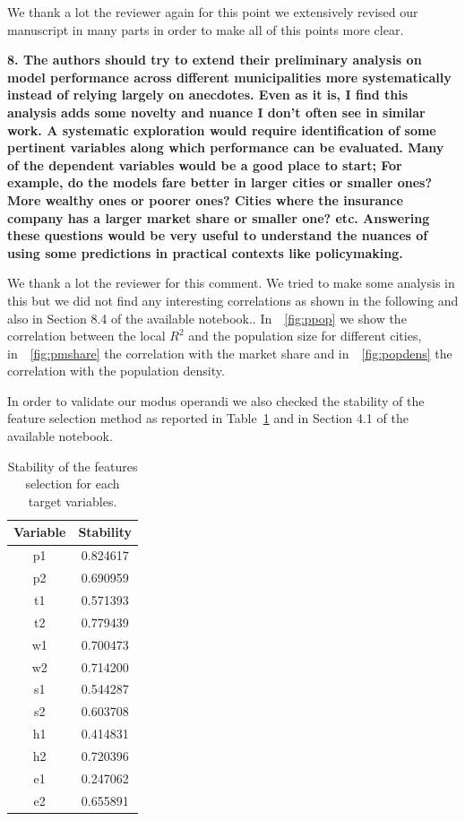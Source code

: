 \documentclass[12pt]{article}
\begin{document}
We thank a lot the reviewer again for this point we extensively revised our manuscript in many parts in order to make all of this points more clear. 

\textbf{8. The authors should try to extend their preliminary analysis on model performance across different municipalities more systematically instead of relying largely on anecdotes. Even as it is, I find this analysis adds some novelty and nuance I don't often see in similar work. A systematic exploration would require identification of some pertinent variables along which performance can be evaluated. Many of the dependent variables would be a good place to start; For example, do the models fare better in larger cities or smaller ones? More wealthy ones or poorer ones? Cities where the insurance company has a larger market share or smaller one? etc. Answering these questions would be very useful to understand the nuances of using some predictions in practical contexts like policymaking.}

We thank a lot the reviewer for this comment. We tried to make some analysis in this but we did not find any interesting correlations as shown in the following and also in Section 8.4 of the available notebook.. In~\figurename~\ref{fig:ppop} we show the correlation between the local $R^2$ and the population size for different cities, in~\figurename~\ref{fig:pmshare} the correlation with the market share and in~\figurename~\ref{fig:popdens} the correlation with the population density.

In order to validate our modus operandi we also checked the stability of the feature selection method as reported in Table~\ref{tab:stability} and in  Section 4.1 of the available notebook.

\begin{table}[h!]
\centering
\caption{Stability of the features selection for each target variables.}
\label{tab:stability}
\begin{tabular}{cc}
\hline
 Variable  & Stability \\
\hline

p1& 0.824617\\
p2& 0.690959\\
t1& 0.571393\\
t2& 0.779439\\
w1& 0.700473\\
w2& 0.714200\\
s1& 0.544287\\
s2& 0.603708\\
h1& 0.414831\\
h2& 0.720396\\
e1& 0.247062\\
e2& 0.655891\\
\end{tabular}
\end{table}
\end{document}
